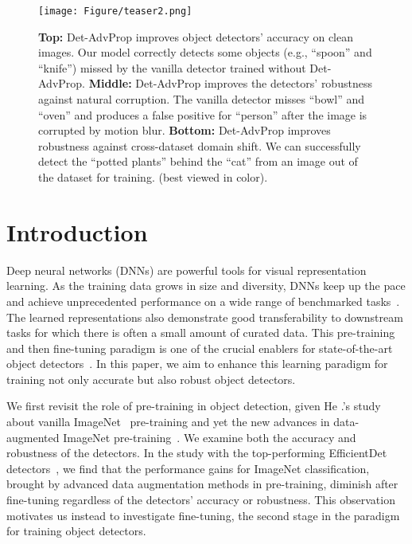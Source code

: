 \documentclass[final]{cvpr}
\begin{document}
\begin{figure}
\centering
\texttt{[image: Figure/teaser2.png]}
\caption{
\textbf{Top:}
Det-AdvProp improves object detectors' accuracy on clean images.
Our model correctly detects some objects (e.g., ``spoon'' and ``knife'') missed by the vanilla detector trained without Det-AdvProp.
\textbf{Middle:}
Det-AdvProp improves the detectors' robustness against natural corruption.
The vanilla detector misses ``bowl'' and ``oven'' and produces a false positive for ``person'' after the image is corrupted by motion blur.
\textbf{Bottom:}
Det-AdvProp improves robustness against cross-dataset domain shift.
We can successfully detect the ``potted plants'' behind the ``cat'' from an image out of the dataset for training. (best viewed in color).
}
\vspace{-12pt}
\label{fig:teaser}
\end{figure}


\section{Introduction}
Deep neural networks (DNNs) are powerful tools for visual representation learning. As the training data grows in size and diversity, DNNs keep up the pace and achieve unprecedented performance on a wide range of benchmarked tasks~\cite{he2016resnet, ren2015faster, redmon2016yolo, long2015fcn, he2017mask, qi2018frustum}. The learned representations also demonstrate good transferability to downstream tasks for which there is often a small amount of curated data. This pre-training and then fine-tuning paradigm is one of the crucial enablers for state-of-the-art object detectors~\cite{tan2019enet, he2019rethinking, redmon2016yolo, lin2017focal, liu2016ssd}. In this paper, we aim to enhance this learning paradigm for training not only accurate but also robust object detectors. 







We first revisit the role of pre-training in object detection, given He \etal.'s study~\cite{he2019rethinking} about vanilla ImageNet~\cite{deng2009imagenet} pre-training and yet the new advances in data-augmented ImageNet pre-training~\cite{xie2020self, xie2020advprop}. 
We examine both the accuracy and robustness of the detectors. 
In the study with the top-performing EfficientDet detectors~\cite{tan2020edet}, we find that the performance gains for ImageNet classification, brought by advanced data augmentation methods in pre-training, diminish after fine-tuning regardless of the detectors' accuracy or robustness. 
This observation motivates us instead to investigate fine-tuning, the second stage in the paradigm for training object detectors.
\end{document}
